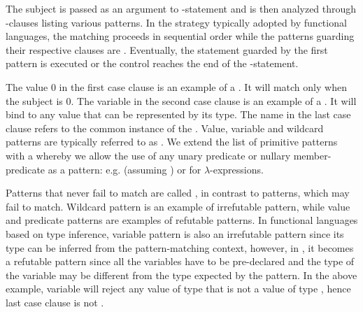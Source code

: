 \noindent
The subject  is passed as an argument to -statement and is 
then analyzed through -clauses listing various patterns. In the 
 strategy typically adopted by functional languages, the 
matching proceeds in sequential order while the patterns guarding their 
respective clauses are . Eventually, the statement guarded by the 
first  pattern is executed or the control reaches the end of 
the -statement.

The value 0 in the first case clause is an example of a . It 
will match only when the subject  is 0. The variable  in the 
second case clause is an example of a . It will bind to 
any value that can be represented by its type. The name \code{_} in the last 
case clause refers to the common instance of the . Value, 
variable and wildcard patterns are typically referred to as . We extend the list of primitive patterns with a  whereby we allow the use of any unary predicate or nullary 
member-predicate as a pattern: e.g.  (assuming 
) or  for $\lambda$-expressions.

Patterns that never fail to match are called , in contrast to 
 patterns, which may fail to match. Wildcard pattern is an 
example of irrefutable pattern, while value and predicate patterns are examples 
of refutable patterns. In functional languages based on type inference, variable 
pattern is also an irrefutable pattern since its type can be inferred from the 
pattern-matching context, however, in \Cpp{}, it becomes a refutable pattern 
since all the variables have to be pre-declared and the type of the variable may 
be different from the type expected by the pattern. In the above example, 
variable  will reject any value of type  that is not a value
of type , hence last case clause is not .

